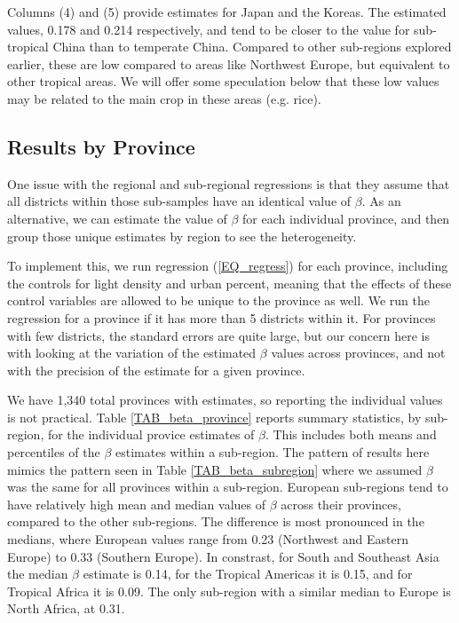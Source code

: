 \documentclass[11pt]{article}
\begin{document}
Columns (4) and (5) provide estimates for Japan and the Koreas. The estimated values, 0.178 and 0.214 respectively, and tend to be closer to the value for sub-tropical China than to temperate China. Compared to other sub-regions explored earlier, these are low compared to areas like Northwest Europe, but equivalent to other tropical areas. We will offer some speculation below that these low values may be related to the main crop in these areas (e.g. rice).

\subsection{Results by Province}
One issue with the regional and sub-regional regressions is that they assume that all districts within those sub-samples have an identical value of $\beta$. As an alternative, we can estimate the value of $\beta$ for each individual province, and then group those unique estimates by region to see the heterogeneity. 

To implement this, we run regression (\ref{EQ_regress}) for each province, including the controls for light density and urban percent, meaning that the effects of these control variables are allowed to be unique to the province as well. We run the regression for a province if it has more than 5 districts within it. For provinces with few districts, the standard errors are quite large, but our concern here is with looking at the variation of the estimated $\beta$ values across provinces, and not with the precision of the estimate for a given province.

We have 1,340 total provinces with estimates, so reporting the individual values is not practical. Table \ref{TAB_beta_province} reports summary statistics, by sub-region, for the individual provice estimates of $\beta$. This includes both means and percentiles of the $\beta$ estimates within a sub-region. The pattern of results here mimics the pattern seen in Table \ref{TAB_beta_subregion} where we assumed $\beta$ was the same for all provinces within a sub-region. European sub-regions tend to have relatively high mean and median values of $\beta$ across their provinces, compared to the other sub-regions. The difference is most pronounced in the medians, where European values range from 0.23 (Northwest and Eastern Europe) to 0.33 (Southern Europe). In constrast, for South and Southeast Asia the median $\beta$ estimate is 0.14, for the Tropical Americas it is 0.15, and for Tropical Africa it is 0.09. The only sub-region with a similar median to Europe is North Africa, at 0.31. 
\end{document}
